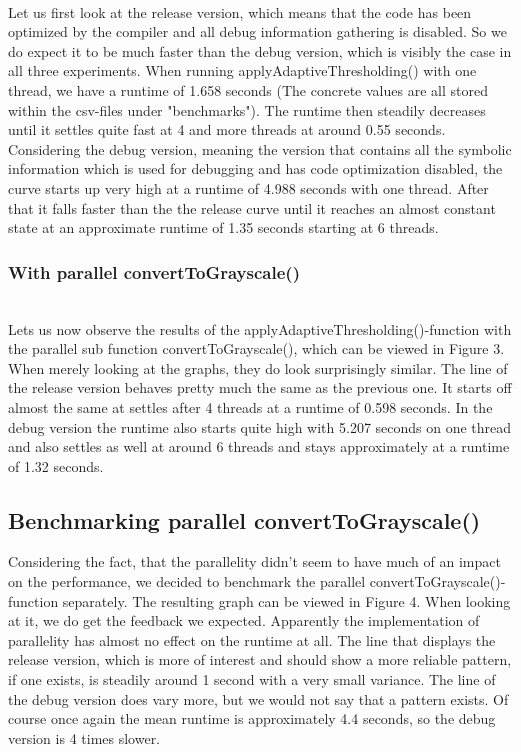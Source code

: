 \documentclass[sigconf]{acmart}
\begin{document}
\text{   }\\
Let us first look at the release version, which means that the code has been optimized by the compiler and all debug information gathering is disabled. So we do expect it to be much faster than the debug version, which is visibly the case in all three experiments. When running applyAdaptiveThresholding() with one thread, we have a runtime of 1.658 seconds (The concrete values are all stored within the csv-files under "benchmarks"). The runtime then steadily decreases until it settles quite fast at 4 and more threads at around 0.55 seconds. \\
Considering the debug version, meaning the version that contains all the symbolic information which is used for debugging and has code optimization disabled, the curve starts up very high at a runtime of 4.988 seconds with one thread. After that it falls faster than the the release curve until it reaches an almost constant state at an approximate runtime of 1.35 seconds starting at 6 threads. 

\subsubsection{With parallel convertToGrayscale()}

\text{   }\\
Lets us now observe the results of the applyAdaptiveThresholding()-function with the parallel sub function convertToGrayscale(), which can be viewed in Figure 3. When merely looking at the graphs, they do look surprisingly similar. The line of the release version behaves pretty much the same as the previous one. It starts off almost the same at settles after 4 threads at a runtime of 0.598 seconds. 
In the debug version the runtime also starts quite high with 5.207 seconds on one thread and also settles as well at around 6 threads and stays approximately at a runtime of 1.32 seconds.

\subsection{Benchmarking parallel convertToGrayscale()}

Considering the fact, that the parallelity didn't seem to have much of an impact on the performance, we decided to benchmark the parallel convertToGrayscale()-function separately. The resulting graph can be viewed in Figure 4. When looking at it, we do get the feedback we expected. Apparently the implementation of parallelity has almost no effect on the runtime at all. The line that displays the release version, which is more of interest and should show a more reliable pattern, if one exists, is steadily around 1 second with a very small variance. The line of the debug version does vary more, but we would not say that a pattern exists. Of course once again the mean runtime is approximately 4.4 seconds, so the debug version is 4 times slower. 
\end{document}
